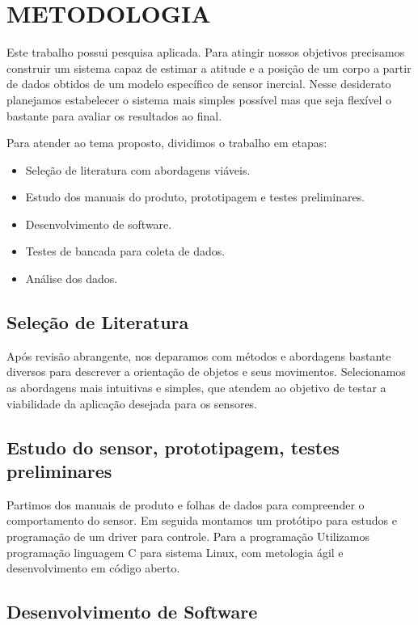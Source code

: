 \chapter{METODOLOGIA}\label{chap:metodologia}

Este trabalho possui pesquisa aplicada. Para atingir nossos objetivos precisamos construir um sistema capaz de estimar a atitude e a posição de um corpo a partir de dados obtidos de um modelo específico de sensor inercial. Nesse desiderato planejamos estabelecer o sistema mais simples possível mas que seja flexível o bastante para avaliar os resultados ao final.

Para atender ao tema proposto, dividimos o trabalho em etapas:
\begin{itemize}
    \item Seleção de literatura com abordagens viáveis.
    \item Estudo dos manuais do produto, prototipagem e testes preliminares.
    \item Desenvolvimento de software.
    \item Testes de bancada para coleta de dados.
    \item Análise dos dados.
\end{itemize}

\section{Seleção de Literatura}

Após revisão abrangente, nos deparamos com métodos e abordagens bastante diversos para descrever a orientação de objetos e seus movimentos. Selecionamos as abordagens mais intuitivas e simples, que atendem ao objetivo de testar a viabilidade da aplicação desejada para os sensores.

\section{Estudo do sensor, prototipagem, testes preliminares}

Partimos dos manuais de produto e folhas de dados para compreender o comportamento do sensor. Em seguida montamos um protótipo para estudos e programação de um driver para controle. Para a programação Utilizamos programação linguagem C para sistema Linux, com metologia ágil e desenvolvimento em código aberto.

\section{Desenvolvimento de Software}

